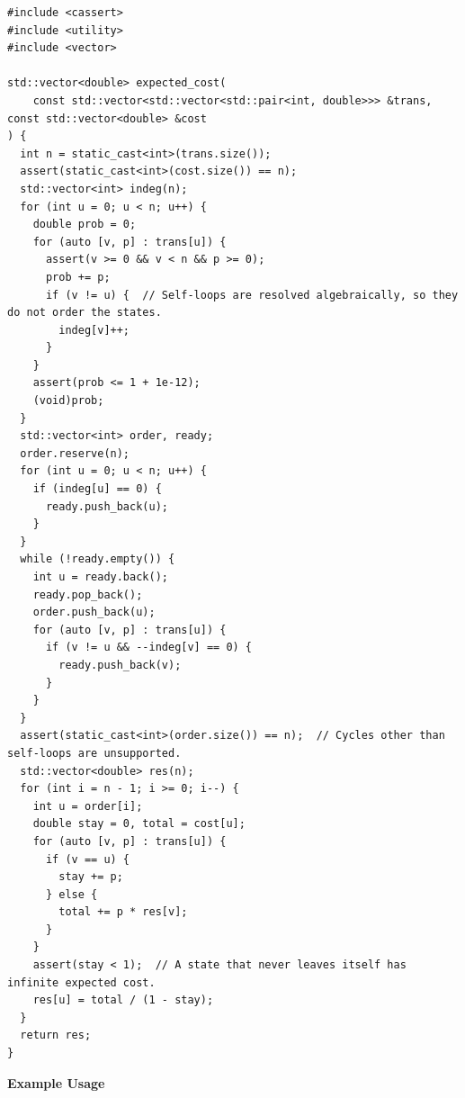 \begin{lstlisting}[style=cpp]
#include <cassert>
#include <utility>
#include <vector>

std::vector<double> expected_cost(
    const std::vector<std::vector<std::pair<int, double>>> &trans, const std::vector<double> &cost
) {
  int n = static_cast<int>(trans.size());
  assert(static_cast<int>(cost.size()) == n);
  std::vector<int> indeg(n);
  for (int u = 0; u < n; u++) {
    double prob = 0;
    for (auto [v, p] : trans[u]) {
      assert(v >= 0 && v < n && p >= 0);
      prob += p;
      if (v != u) {  // Self-loops are resolved algebraically, so they do not order the states.
        indeg[v]++;
      }
    }
    assert(prob <= 1 + 1e-12);
    (void)prob;
  }
  std::vector<int> order, ready;
  order.reserve(n);
  for (int u = 0; u < n; u++) {
    if (indeg[u] == 0) {
      ready.push_back(u);
    }
  }
  while (!ready.empty()) {
    int u = ready.back();
    ready.pop_back();
    order.push_back(u);
    for (auto [v, p] : trans[u]) {
      if (v != u && --indeg[v] == 0) {
        ready.push_back(v);
      }
    }
  }
  assert(static_cast<int>(order.size()) == n);  // Cycles other than self-loops are unsupported.
  std::vector<double> res(n);
  for (int i = n - 1; i >= 0; i--) {
    int u = order[i];
    double stay = 0, total = cost[u];
    for (auto [v, p] : trans[u]) {
      if (v == u) {
        stay += p;
      } else {
        total += p * res[v];
      }
    }
    assert(stay < 1);  // A state that never leaves itself has infinite expected cost.
    res[u] = total / (1 - stay);
  }
  return res;
}
\end{lstlisting}
\textbf{Example Usage}\par
